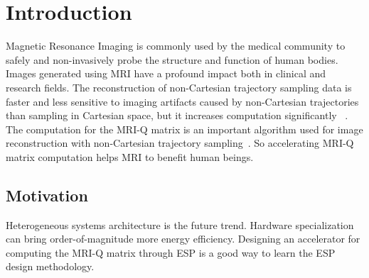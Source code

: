 \section{Introduction}
\label{sec:intro}
Magnetic Resonance Imaging is commonly used by the medical community to safely 
and non-invasively probe the structure and function of human bodies. Images 
generated using MRI have a profound impact both in clinical and research fields.
 The reconstruction of non-Cartesian trajectory sampling data is faster and 
less sensitive to imaging artifacts caused by non-Cartesian trajectories than 
sampling in Cartesian space, but it increases computation significantly
~\cite{stone2008accelerating}. The computation for the MRI-Q matrix is an important 
algorithm used for image reconstruction with non-Cartesian trajectory 
sampling~\cite{stratton2012parboil}. So accelerating MRI-Q matrix 
computation helps MRI to benefit human beings.

\subsection{Motivation}
Heterogeneous systems architecture is the future trend. Hardware specialization 
can bring order-of-magnitude more energy efficiency. Designing an accelerator 
for computing the MRI-Q matrix through ESP is a good way to learn the ESP design
 methodology.

